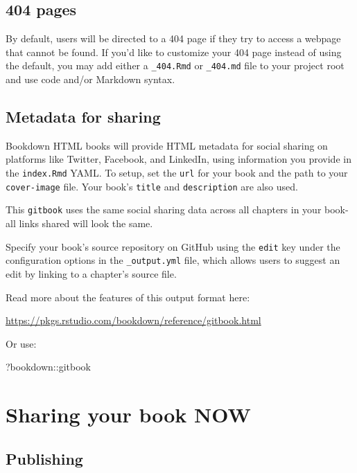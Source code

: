 \documentclass[
]{book}
\newenvironment{Shaded}{\begin{snugshade}}{\end{snugshade}}
\newcommand{\NormalTok}[1]{#1}
\newcommand{\SpecialCharTok}[1]{\textcolor[rgb]{0.00,0.00,0.00}{#1}}
\begin{document}
\hypertarget{pages-1}{%
\section{404 pages}\label{pages-1}}

By default, users will be directed to a 404 page if they try to access a webpage that cannot be found. If you'd like to customize your 404 page instead of using the default, you may add either a \texttt{\_404.Rmd} or \texttt{\_404.md} file to your project root and use code and/or Markdown syntax.

\hypertarget{metadata-for-sharing-1}{%
\section{Metadata for sharing}\label{metadata-for-sharing-1}}

Bookdown HTML books will provide HTML metadata for social sharing on platforms like Twitter, Facebook, and LinkedIn, using information you provide in the \texttt{index.Rmd} YAML. To setup, set the \texttt{url} for your book and the path to your \texttt{cover-image} file. Your book's \texttt{title} and \texttt{description} are also used.

This \texttt{gitbook} uses the same social sharing data across all chapters in your book- all links shared will look the same.

Specify your book's source repository on GitHub using the \texttt{edit} key under the configuration options in the \texttt{\_output.yml} file, which allows users to suggest an edit by linking to a chapter's source file.

Read more about the features of this output format here:

\url{https://pkgs.rstudio.com/bookdown/reference/gitbook.html}

Or use:

\begin{Shaded}
\begin{Highlighting}[]
\NormalTok{?bookdown}\SpecialCharTok{::}\NormalTok{gitbook}
\end{Highlighting}
\end{Shaded}

\hypertarget{sharing-your-book-now}{%
\chapter{Sharing your book NOW}\label{sharing-your-book-now}}

\hypertarget{publishing-2}{%
\section{Publishing}\label{publishing-2}}
\end{document}
